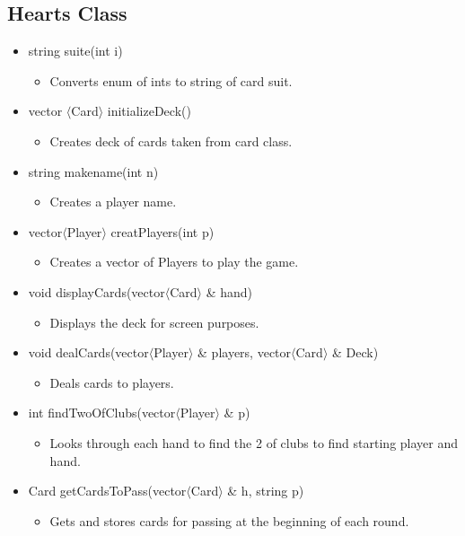 \documentclass[]{scrartcl}
\begin{document}
\subsection{Hearts Class}
 \begin{itemize}
 	\item string suite(int i)
 		\begin{itemize}
 			\item Converts enum of ints to string of card suit.
 		\end{itemize}
 	\item vector $\langle$Card$\rangle$ initializeDeck()
 		\begin{itemize}
 			\item Creates deck of cards taken from card class.
 		\end{itemize}
 	\item string makename(int n)
 		\begin{itemize}
 			\item 	Creates a player name.
 		\end{itemize}
 	\item vector$\langle$Player$\rangle$  creatPlayers(int p)
 		\begin{itemize}
 			\item Creates a vector of Players to play the game.
 		\end{itemize}
 	\item void displayCards(vector$\langle$Card$\rangle$ \& hand)
 		\begin{itemize}
 			\item Displays the deck for screen purposes.
 		\end{itemize}
 	\item void dealCards(vector$\langle$Player$\rangle$ \& players, vector$\langle$Card$\rangle$ \& Deck)
 		\begin{itemize}
 			\item Deals cards to players.
 		\end{itemize}
 	\item int findTwoOfClubs(vector$\langle$Player$\rangle$ \& p)
 		\begin{itemize}
 			\item Looks through each hand to find the 2 of clubs to find starting player and hand.
 		\end{itemize}
 	\item Card getCardsToPass(vector$\langle$Card$\rangle$ \& h, string p)
 		\begin{itemize}
 			\item Gets and stores cards for passing at the beginning of each round.

\end{itemize}
\end{itemize}
\end{document}
